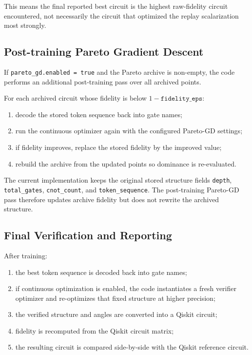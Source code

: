 \documentclass[11pt]{article}
\begin{document}
This means the final reported best circuit is the highest raw-fidelity circuit encountered, not necessarily the circuit that optimized the replay scalarization most strongly.

\subsection{Post-training Pareto Gradient Descent}

If \texttt{pareto\_gd.enabled = true} and the Pareto archive is non-empty, the code performs an additional post-training pass over all archived points.

For each archived circuit whose fidelity is below $1-\texttt{fidelity\_eps}$:
\begin{enumerate}[leftmargin=*]
\item decode the stored token sequence back into gate names;
\item run the continuous optimizer again with the configured Pareto-GD settings;
\item if fidelity improves, replace the stored fidelity by the improved value;
\item rebuild the archive from the updated points so dominance is re-evaluated.
\end{enumerate}

The current implementation keeps the original stored structure fields \texttt{depth}, \texttt{total\_gates}, \texttt{cnot\_count}, and \texttt{token\_sequence}. The post-training Pareto-GD pass therefore updates archive fidelity but does not rewrite the archived structure.

\subsection{Final Verification and Reporting}

After training:
\begin{enumerate}[leftmargin=*]
\item the best token sequence is decoded back into gate names;
\item if continuous optimization is enabled, the code instantiates a fresh verifier optimizer and re-optimizes that fixed structure at higher precision;
\item the verified structure and angles are converted into a Qiskit circuit;
\item fidelity is recomputed from the Qiskit circuit matrix;
\item the resulting circuit is compared side-by-side with the Qiskit reference circuit.
\end{enumerate}
\end{document}
